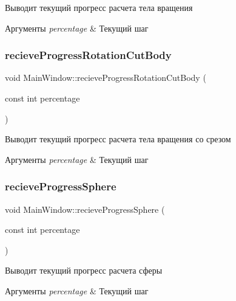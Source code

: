 Выводит текущий прогресс расчета тела вращения 
\begin{DoxyParams}{Аргументы}
{\em percentage} & Текущий шаг \\
\hline
\end{DoxyParams}
\mbox{\label{class_main_window_a5d9756062e5b00dbfc83605498716479}} 
\subsubsection{\texorpdfstring{recieve\+Progress\+Rotation\+Cut\+Body}{recieveProgressRotationCutBody}}
{\footnotesize\ttfamily void Main\+Window\+::recieve\+Progress\+Rotation\+Cut\+Body (\begin{DoxyParamCaption}\item[{const int}]{percentage }\end{DoxyParamCaption})\hspace{0.3cm}{\ttfamily [slot]}}

Выводит текущий прогресс расчета тела вращения со срезом 
\begin{DoxyParams}{Аргументы}
{\em percentage} & Текущий шаг \\
\hline
\end{DoxyParams}
\mbox{\label{class_main_window_a2066789c6e6e98dfd13709a565867f16}} 
\subsubsection{\texorpdfstring{recieve\+Progress\+Sphere}{recieveProgressSphere}}
{\footnotesize\ttfamily void Main\+Window\+::recieve\+Progress\+Sphere (\begin{DoxyParamCaption}\item[{const int}]{percentage }\end{DoxyParamCaption})\hspace{0.3cm}{\ttfamily [slot]}}

Выводит текущий прогресс расчета сферы 
\begin{DoxyParams}{Аргументы}
{\em percentage} & Текущий шаг \\
\hline
\end{DoxyParams}
\mbox{\label{class_main_window_a1ef9379070e1d8ab765b13468c8922e1}} 
